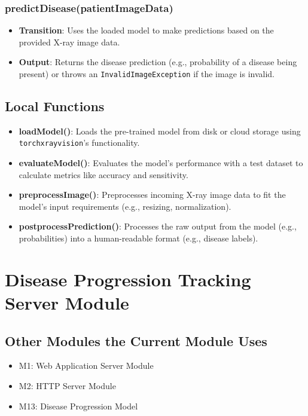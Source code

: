 \documentclass[12pt, titlepage]{article}
\begin{document}
\subsubsection{predictDisease(patientImageData)}
\begin{itemize}
    \item \textbf{Transition}: Uses the loaded model to make predictions based on the provided X-ray image data.
    \item \textbf{Output}: Returns the disease prediction (e.g., probability of a disease being present) or throws an \texttt{InvalidImageException} if the image is invalid.
\end{itemize}

\subsection{Local Functions}
\begin{itemize}
    \item \textbf{loadModel()}: Loads the pre-trained model from disk or cloud storage using \texttt{torchxrayvision}'s functionality.
    \item \textbf{evaluateModel()}: Evaluates the model’s performance with a test dataset to calculate metrics like accuracy and sensitivity.
    \item \textbf{preprocessImage()}: Preprocesses incoming X-ray image data to fit the model's input requirements (e.g., resizing, normalization).
    \item \textbf{postprocessPrediction()}: Processes the raw output from the model (e.g., probabilities) into a human-readable format (e.g., disease labels).
\end{itemize}

\section{Disease Progression Tracking Server Module}

\subsection{Other Modules the Current Module Uses}
\begin{itemize}
\item M1: Web Application Server Module
\item M2: HTTP Server Module
\item M13: Disease Progression Model
\end{itemize}
\end{document}
